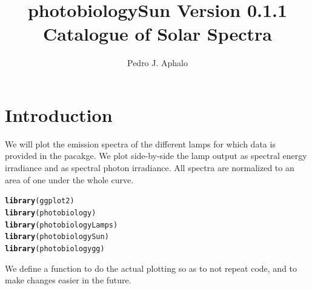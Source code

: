 \documentclass{article}\usepackage[]{graphicx}\usepackage[]{color}
\makeatletter
\newcommand{\hlstd}[1]{\textcolor[rgb]{0.345,0.345,0.345}{#1}}%
\newcommand{\hlkwd}[1]{\textcolor[rgb]{0.737,0.353,0.396}{\textbf{#1}}}%
\newenvironment{kframe}{%
 \def\at@end@of@kframe{}%
 \ifinner\ifhmode%
  \def\at@end@of@kframe{\end{minipage}}%
  \begin{minipage}{\columnwidth}%
 \fi\fi%
 \def\FrameCommand##1{\hskip\@totalleftmargin \hskip-\fboxsep
 \colorbox{shadecolor}{##1}\hskip-\fboxsep
     \hskip-\linewidth \hskip-\@totalleftmargin \hskip\columnwidth}%
 \MakeFramed {\advance\hsize-\width
   \@totalleftmargin\z@ \linewidth\hsize
   \@setminipage}}%
 {\par\unskip\endMakeFramed%
 \at@end@of@kframe}
\newenvironment{knitrout}{}{} %
\newcommand{\PBSun}{\textsf{photobiologySun}\xspace}
\makeatother
\begin{document}
\title{\PBSun Version 0.1.1\\ Catalogue of Solar Spectra}
\author{Pedro J. Aphalo}

\maketitle

\section{Introduction}

We will plot the emission spectra of the different lamps for which data is provided in the pacakge. We plot side-by-side the lamp output as spectral energy irradiance and as spectral photon irradiance. All spectra are normalized to an area of one under the whole curve.




\begin{knitrout}\footnotesize
{}\color{fgcolor}\begin{kframe}
\begin{alltt}
\hlkwd{library}\hlstd{(ggplot2)}
\hlkwd{library}\hlstd{(photobiology)}
\hlkwd{library}\hlstd{(photobiologyLamps)}
\hlkwd{library}\hlstd{(photobiologySun)}
\hlkwd{library}\hlstd{(photobiologygg)}
\end{alltt}


{\ttfamily\noindent\itshape\color{messagecolor}{\#\# Loading required package: proto\\\#\# Loading required package: splus2R\\\#\# Loading required package: plyr}}\end{kframe}
\end{knitrout}


We define a function to do the actual plotting so as to not repeat code, and to make changes easier in the future.
\end{document}
